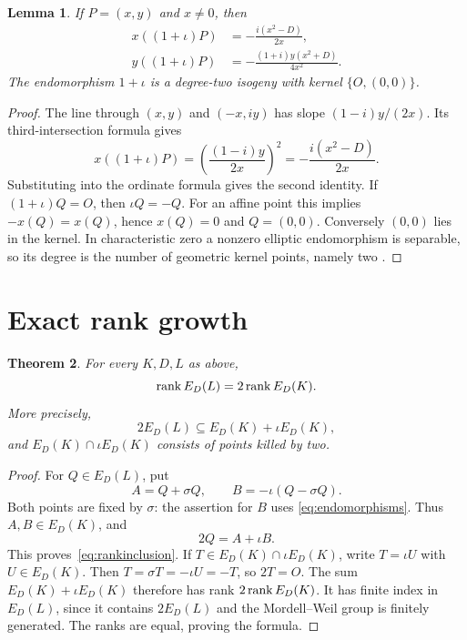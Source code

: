 \documentclass[11pt,a4paper]{article}
\newtheorem{theorem}{Theorem}[section]
\newtheorem{lemma}[theorem]{Lemma}
\begin{document}
\begin{lemma}\label{lem:coordinates}
If $P=(x,y)$ and $x\ne0$, then
\begin{equation}\label{eq:Ccoordinates}
 \begin{split}
 x((1+\iota)P)&=-\frac{i(x^2-D)}{2x},\\
 y((1+\iota)P)&=-\frac{(1+i)y(x^2+D)}{4x^2}.
 \end{split}
\end{equation}
The endomorphism $1+\iota$ is a degree-two isogeny with kernel
$\{O,(0,0)\}$.
\end{lemma}
\begin{proof}
The line through $(x,y)$ and $(-x,iy)$ has slope
$(1-i)y/(2x)$. Its third-intersection formula gives
\[
 x((1+\iota)P)
       =\left(\frac{(1-i)y}{2x}\right)^2
       =-\frac{i(x^2-D)}{2x}.
\]
Substituting into the ordinate formula gives the second identity.
If $(1+\iota)Q=O$, then $\iota Q=-Q$. For an affine point this
implies $-x(Q)=x(Q)$, hence $x(Q)=0$ and $Q=(0,0)$.
Conversely $(0,0)$ lies in the kernel. In characteristic zero a
nonzero elliptic endomorphism is separable, so its degree is the
number of geometric kernel points, namely two
\cite[Chapter III, Sections 4 and 6]{Silverman}.
\end{proof}

\section{Exact rank growth}

\begin{theorem}\label{thm:rank}
For every $K,D,L$ as above,
\[
                         \operatorname{rank} E_D(L)=2\operatorname{rank} E_D(K).
\]
More precisely,
\begin{equation}\label{eq:rankinclusion}
           2E_D(L)\subseteq E_D(K)+\iota E_D(K),
\end{equation}
and $E_D(K)\cap\iota E_D(K)$ consists of points killed by two.
\end{theorem}
\begin{proof}
For $Q\in E_D(L)$, put
\[
 A=Q+\sigma Q,\qquad B=-\iota(Q-\sigma Q).
\]
Both points are fixed by $\sigma$: the assertion for $B$ uses
\eqref{eq:endomorphisms}. Thus $A,B\in E_D(K)$, and
\[
                              2Q=A+\iota B.
\]
This proves~\eqref{eq:rankinclusion}.
If $T\in E_D(K)\cap\iota E_D(K)$, write $T=\iota U$ with
$U\in E_D(K)$. Then $T=\sigma T=-\iota U=-T$, so $2T=O$.
The sum $E_D(K)+\iota E_D(K)$ therefore has rank
$2\operatorname{rank} E_D(K)$. It has finite index in $E_D(L)$, since it
contains $2E_D(L)$ and the Mordell--Weil group is finitely generated.
The ranks are equal, proving the formula.
\end{proof}
\end{document}

